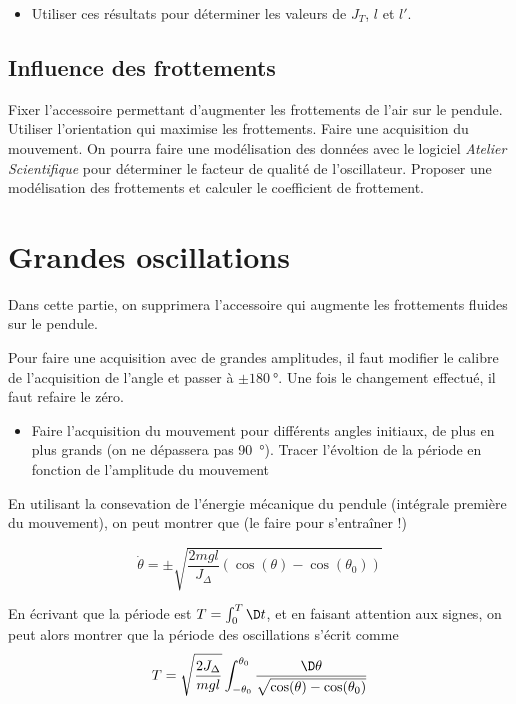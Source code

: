 \documentclass{tp}
\begin{document}
\begin{itemize}
  \item Utiliser ces résultats pour déterminer les valeurs de $J_T$, $l$ et $l'$. 
\end{itemize}

\subsection{Influence des frottements}%
\label{sub:influence_des_frottements}

Fixer l'accessoire permettant d'augmenter les frottements de l'air sur le pendule. Utiliser l'orientation qui maximise les frottements. Faire une acquisition du mouvement. On pourra faire une modélisation des données avec le logiciel \textit{Atelier Scientifique} pour déterminer le facteur de qualité de l'oscillateur. Proposer une modélisation des frottements et calculer le coefficient de frottement.

\section{Grandes oscillations}%
\label{sec:grandes_oscillations}
Dans cette partie, on supprimera l'accessoire qui augmente les frottements fluides sur le pendule.

Pour faire une acquisition avec de grandes amplitudes, il faut modifier le calibre de l'acquisition de l'angle et passer à $\pm\SI{180}{\degree}$. Une fois le changement effectué, il faut refaire le zéro.
\begin{itemize}
  \item Faire l'acquisition du mouvement pour différents angles initiaux, de plus en plus grands (on ne dépassera pas \SI{90}{\degree}). Tracer l'évoltion de la période en fonction de l'amplitude du mouvement 
\end{itemize}

En utilisant la consevation de l'énergie mécanique du pendule (intégrale première du mouvement), on peut montrer que (le faire pour s'entraîner !)

\begin{equation}
  \dot{\theta} = \pm \sqrt{\frac{2mgl}{J_\Delta}\left( \cos(\theta)-\cos(\theta_0) \right) }
\end{equation}

En écrivant que la période est $T=\int_0^T \D t$, et en faisant attention aux signes, on peut alors montrer que la période des oscillations s'écrit comme 
\begin{equation}
  T = \sqrt{\frac{2J_\Delta}{mgl}}\int_{-\theta_0}^{\theta_0} \frac{\D \theta}{\sqrt{\cos(\theta)-\cos(\theta_0)}}
  \label{eq:periode}
\end{equation}
\end{document}
